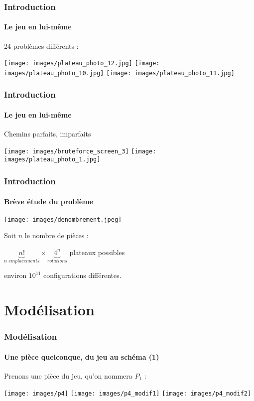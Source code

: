 \documentclass{beamer}
\begin{document}
\begin{frame}
    \frametitle{Introduction}
    \framesubtitle{Le jeu en lui-même}
	24 problèmes différents : 
	\begin{center}
		\hspace*{\fill} \texttt{[image: images/plateau\_photo\_12.jpg]}  \hspace*{\fill} \texttt{[image: images/plateau\_photo\_10.jpg]} \hspace*{\fill} \texttt{[image: images/plateau\_photo\_11.jpg]} \hspace*{\fill}
	\end{center}
    

\end{frame}
\begin{frame}
    \frametitle{Introduction}
    \framesubtitle{Le jeu en lui-même}
	Chemins parfaits, imparfaits 


	\begin{center}
		\hspace*{\fill}
		\texttt{[image: images/bruteforce\_screen\_3]} \hspace*{\fill}
		\texttt{[image: images/plateau\_photo\_1.jpg]} \hspace*{\fill}
	\end{center}
    

\end{frame}
\begin{frame}
	\frametitle{Introduction}
	\framesubtitle{Brève étude du problème}
	\begin{center}
		\texttt{[image: images/denombrement.jpeg]}
\end{center}
Soit $n$ le nombre de pièces :
	\begin{center}
		$\underbrace{n!}_{n \textit{ emplacements}} \times \underbrace{4^{n}}_{ \textit{rotations}}$ plateaux possibles 
	\end{center}
	\small environ $10^{11}$ configurations différentes.
	
\end{frame}


\section{Modélisation}    

\begin{frame}
    \frametitle{Modélisation}
    \framesubtitle{Une pièce quelconque, du jeu au schéma (1)}
		Prenons une pièce du jeu, qu'on nommera $P_1$ : 
			\begin{center}
				\texttt{[image: images/p4]}
				\vskip 0.25cm
				\texttt{[image: images/p4\_modif1]}
				\vskip 0.25cm
				\texttt{[image: images/p4\_modif2]}
				
			\end{center}
\end{frame}
\end{document}
